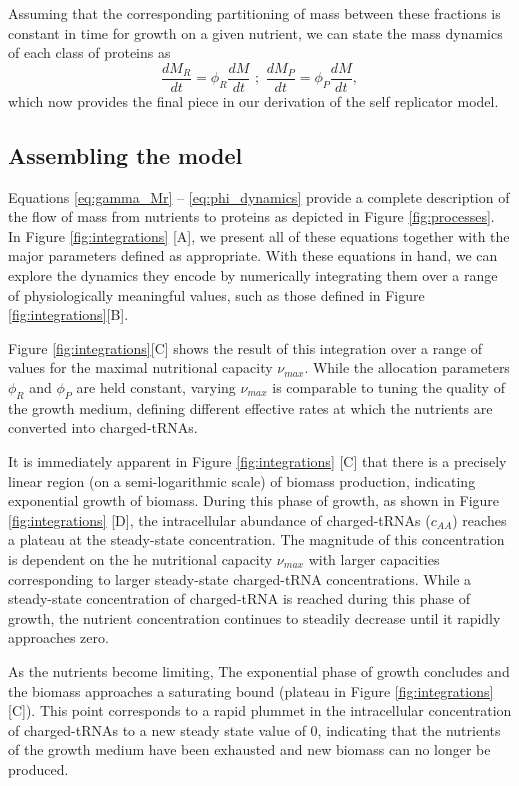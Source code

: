 Assuming that the corresponding partitioning 
of mass between these fractions is constant in time for growth on a given nutrient, 
we can state the mass dynamics of each class of proteins as 
\begin{equation}
\frac{dM_R}{dt} = \phi_R \frac{dM}{dt} \,\,;\,\, \frac{dM_P}{dt} = \phi_P \frac{dM}{dt},
\label{eq:phi_dynamics}
\end{equation}
which now provides the final piece in our derivation of the self replicator model.

\subsection*{Assembling the model}
Equations \ref{eq:gamma_Mr} -- \ref{eq:phi_dynamics} provide a 
complete description of the flow of mass from nutrients to proteins as depicted in 
Figure \ref{fig:processes}. In Figure \ref{fig:integrations} [A], we present all 
of these equations together with the major parameters defined as appropriate. With 
these equations in hand, we can explore the dynamics they encode by numerically 
integrating them over a range of physiologically meaningful values, such as 
those defined in Figure \ref{fig:integrations}[B]. 

Figure \ref{fig:integrations}[C] shows the result of this integration over a range 
of values for the maximal nutritional capacity $\nu_{max}$. While the allocation 
parameters $\phi_R$ and $\phi_P$ are held constant, varying $\nu_{max}$ is comparable 
to tuning the quality of the growth medium, defining different effective rates at which 
the nutrients are converted into charged-tRNAs. 

It is immediately apparent in Figure \ref{fig:integrations} [C] that there is 
a precisely linear region (on a semi-logarithmic scale) of biomass production, indicating  
exponential growth of biomass. During this phase of growth, as shown in Figure \ref{fig:integrations} [D], 
the intracellular abundance of charged-tRNAs ($c_{AA}$) reaches a plateau 
at the steady-state concentration. The magnitude of this concentration is dependent on the 
he nutritional capacity $\nu_{max}$ with larger capacities corresponding to larger 
steady-state charged-tRNA concentrations. While a steady-state concentration of 
charged-tRNA is reached during this phase of growth, the nutrient concentration 
continues to steadily decrease until it rapidly approaches zero.

As the nutrients become limiting, The exponential phase of growth concludes and 
the biomass approaches a saturating bound (plateau in Figure \ref{fig:integrations}[C]).
This point corresponds to a rapid plummet in the intracellular concentration of 
charged-tRNAs to a new steady state value of 0, indicating that the nutrients 
of the growth medium have been exhausted and new biomass can no longer be produced.


